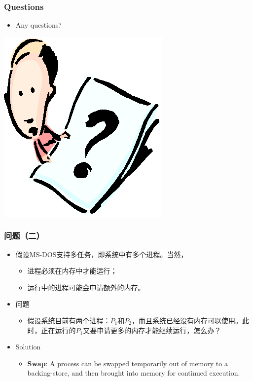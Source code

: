 \documentclass[CJKutf8,xcolor=pdftex,dvipsnames,table]{beamer}
\begin{document}
\begin{CJK*}{UTF8}{song}
  \begin{frame}
  \frametitle{Questions}
  \begin{itemize}
  \item{Any questions?}
  \end{itemize}
  \begin{center}
    \includegraphics[scale=.5]{question}
  \end{center}
  \end{frame}

  \begin{frame}
  \frametitle{问题（二）} \pause
  \begin{itemize}
  \item{假设MS-DOS支持多任务，即系统中有多个进程。当然，}  \pause
    \begin{itemize}
    \item{进程必须在内存中才能运行；}  \pause
    \item{运行中的进程可能会申请额外的内存。}  \pause
    \end{itemize}
  \item{问题} \pause
    \begin{itemize}
    \item{假设系统目前有两个进程：$P_1$和$P_2$，而且系统已经没有内存可以使用。此时，正在运行的$P_1$又要申请更多的内存才能继续运行，怎么办？} \pause
    \end{itemize}
  \item{Solution} \pause
    \begin{itemize}
    \item{\textbf{Swap}: A process can be swapped temporarily out of memory to a backing-store, and then brought into memory for continued execution.}
    \end{itemize}
  \end{itemize}
  \end{frame}
  

\end{CJK*}
\end{document}
